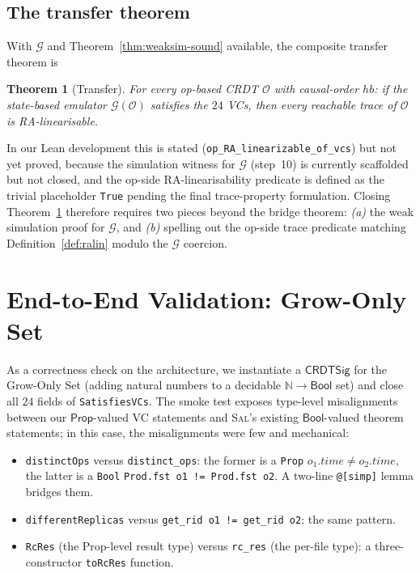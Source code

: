 \documentclass[11pt,a4paper]{article}
\newtheorem{theorem}{Theorem}[section]
\theoremstyle{definition}
\theoremstyle{remark}
\newcommand{\Sal}{\textsc{Sal}}
\newcommand{\Emul}{\mathcal{G}}
\begin{document}
\subsection{The transfer theorem}
\label{sec:transfer}

With $\Emul$ and Theorem~\ref{thm:weaksim-sound} available, the
composite transfer theorem is
\begin{theorem}[Transfer]
\label{thm:transfer}
For every op-based CRDT $\mathcal{O}$ with causal-order
$\mathit{hb}$: if the state-based emulator $\Emul(\mathcal{O})$
satisfies the $24$ VCs, then every reachable trace of $\mathcal{O}$ is
RA-linearisable.
\end{theorem}

In our Lean development this is stated
(\texttt{op\_RA\_linearizable\_of\_vcs}) but not yet proved, because
the simulation witness for $\Emul$ (step~10) is currently scaffolded
but not closed, and the op-side RA-linearisability predicate is
defined as the trivial placeholder \texttt{True} pending the
final trace-property formulation. Closing Theorem~\ref{thm:transfer}
therefore requires two pieces beyond the bridge theorem:
\emph{(a)} the weak simulation proof for $\Emul$, and \emph{(b)}
spelling out the op-side trace predicate matching
Definition~\ref{def:ralin} modulo the $\Emul$ coercion.

\section{End-to-End Validation: Grow-Only Set}
\label{sec:smoke-test}

As a correctness check on the architecture, we instantiate a
$\mathsf{CRDTSig}$ for the Grow-Only Set (adding natural numbers to
a decidable $\mathbb{N} \to \mathsf{Bool}$ set) and close all $24$
fields of \texttt{SatisfiesVCs}. The smoke test exposes type-level
misalignments between our $\mathsf{Prop}$-valued VC statements and
\Sal{}'s existing $\mathsf{Bool}$-valued theorem statements; in this
case, the misalignments were few and mechanical:
\begin{itemize}[leftmargin=*]
  \item \texttt{distinctOps} versus \texttt{distinct\_ops}: the
    former is a \texttt{Prop} $o_1.\mathit{time} \neq o_2.\mathit{time}$,
    the latter is a \texttt{Bool} \texttt{Prod.fst o1 != Prod.fst o2}.
    A two-line \texttt{@[simp]} lemma bridges them.
  \item \texttt{differentReplicas} versus \texttt{get\_rid o1 != get\_rid o2}:
    the same pattern.
  \item \texttt{RcRes} (the Prop-level result type) versus
    \texttt{rc\_res} (the per-file type): a three-constructor
    \texttt{toRcRes} function.
\end{itemize}
\end{document}
